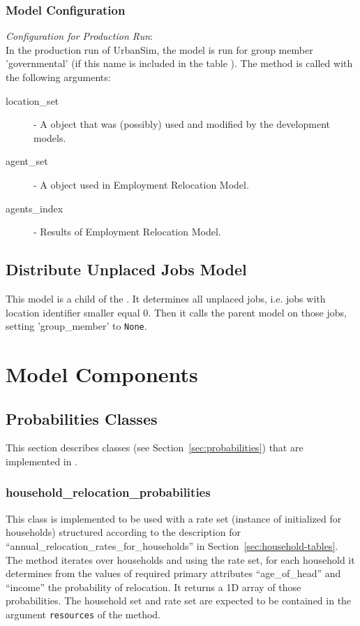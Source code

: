 \subsubsection{Model Configuration}
\modelsindex
%
{\em Configuration for Production Run}:\\[1mm]
In the production run of UrbanSim, the model is run for group member 'governmental' (if this name is included
in the table ).
The  method is called with
the following arguments:
\begin{description}
\item[location_set] - A  object that was (possibly) used
  and modified by the development models. 
\item[agent_set] - A  object used in Employment Relocation
  Model. 
\item[agents_index] - Results of Employment Relocation Model. 
\end{description}


\subsection{Distribute Unplaced Jobs Model}
\modelsindex
%
\label{sec:distribute-unplaced-jobs-model} 
%
This model is a child of the . It determines all unplaced jobs, i.e.
 jobs with location identifier smaller equal 0. Then it calls the parent model on those jobs, setting 
 'group_member' to \verb|None|.

\section{Model Components}
\modelsindex
%
\label{sec:urbansim-model-components}
%
\subsection{Probabilities Classes}
%
\label{sec:urbansim-probabilities}
This section describes  classes (see
Section~\ref{sec:probabilities}) that are implemented in .

\subsubsection{household_relocation_probabilities}
%
This class is implemented to be used with a rate set (instance of
 initialized for households) structured according to the
description for ``annual_relocation_rates_for_households'' in
Section~\ref{sec:household-tables}. The  method iterates over
households and using the rate set, for each household it determines from the
values of required primary attributes \primaryattributesindex ``age_of_head'' and ``income'' the
probability of relocation. It returns a 1D array of those probabilities. The
household set and rate set are expected to be contained in the argument
\verb|resources| of the  method.

